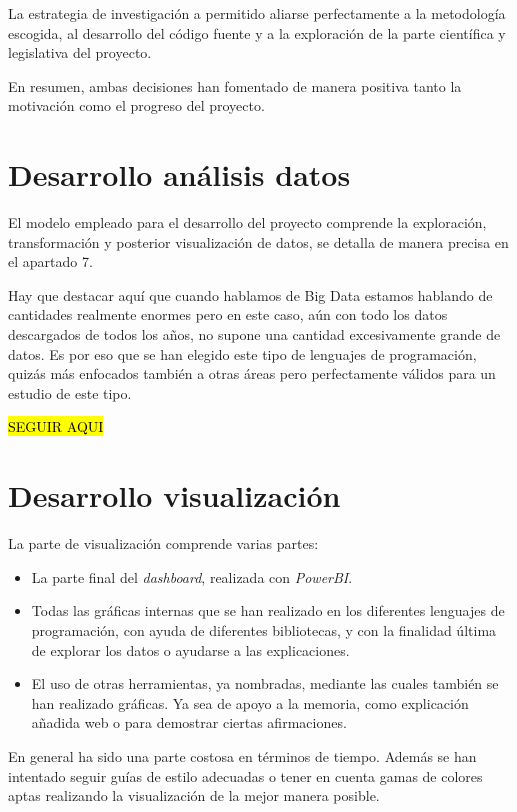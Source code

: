 La estrategia de investigación a permitido aliarse perfectamente a la metodología escogida, al desarrollo del código fuente y a la exploración de la parte científica y legislativa del proyecto.

En resumen, ambas decisiones han fomentado de manera positiva tanto la motivación como el progreso del proyecto.


\section{Desarrollo análisis datos}
El modelo empleado para el desarrollo del proyecto comprende la exploración, transformación y posterior visualización de datos, se detalla de manera precisa en el apartado 7. 

Hay que destacar aquí que cuando hablamos de Big Data estamos hablando de cantidades realmente enormes pero en este caso, aún con todo los datos descargados de todos los años, no supone una cantidad excesivamente grande de datos. Es por eso que se han elegido este tipo de lenguajes de programación, quizás más enfocados también a otras áreas pero perfectamente válidos para un estudio de este tipo.

 \hl{SEGUIR AQUI}
 
\section{Desarrollo visualización}\label{grafico}
La parte de visualización comprende varias partes:

\begin{itemize}
	\item La parte final del \textit{dashboard}, realizada con \textit{PowerBI}.
	\item Todas las gráficas internas que se han realizado en los diferentes lenguajes de programación, con ayuda de diferentes bibliotecas, y con la finalidad última de explorar los datos o ayudarse a las explicaciones.
	\item El uso de otras herramientas, ya nombradas, mediante las cuales también se han realizado gráficas. Ya sea de apoyo a la memoria, como explicación añadida web o para demostrar ciertas afirmaciones.
\end{itemize}

En general ha sido una parte costosa en términos de tiempo. Además se han intentado seguir guías de estilo \cite{visualisation_2016} adecuadas o tener en cuenta gamas de colores aptas realizando la visualización de la mejor manera posible. 

